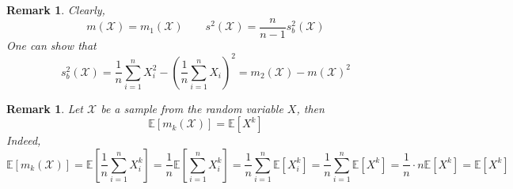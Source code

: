 \documentclass[12pt]{article}
\newtheorem{remark}[theorem]{Remark}
\begin{document}
\begin{remark} Clearly,
    $$
        m(\mathscr{X})=m_{1}(\mathscr{X})
        \quad\quad
        s^2(\mathscr{X})=\frac{n}{n-1}s_b^2(\mathscr{X})
    $$
    One can show that
    $$
        s_b^2(\mathscr{X})
        =\frac{1}{n}
        \sum_{i=1}^n X_i^2-{\left(\frac{1}{n}\sum_{i=1}^n X_i\right)}^2
        =m_2(\mathscr{X})-{m(\mathscr{X})}^2
    $$
\end{remark}

\begin{remark} Let $\mathscr{X}$ be a sample from the random variable $X$, then
    $$
        \mathbb{E}[m_{k}(\mathscr{X})]=\mathbb{E}[X^k]
    $$
    Indeed,
    $$
        \mathbb{E}[m_{k}(\mathscr{X})]
        =\mathbb{E}\left[\frac{1}{n}\sum_{i=1}^n X_i^k\right]
        =\frac{1}{n}\mathbb{E}\left[\sum_{i=1}^n X_i^k\right]
        =\frac{1}{n}\sum_{i=1}^n \mathbb{E}[X_i^k]
        =\frac{1}{n}\sum_{i=1}^n \mathbb{E}[X^k]
        =\frac{1}{n}\cdot n\mathbb{E}[X^k]
        =\mathbb{E}[X^k]
    $$
\end{remark}
\end{document}
